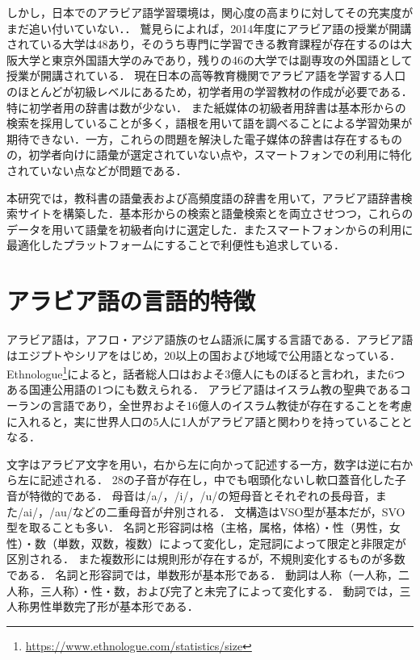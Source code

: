 \documentclass[technicalreport]{ieicej}
\begin{document}
しかし，日本でのアラビア語学習環境は，関心度の高まりに対してその充実度がまだ追い付いていない．．
鷲見\cite{washimi2016}らによれば，2014年度にアラビア語の授業が開講されている大学は48あり，そのうち専門に学習できる教育課程が存在するのは大阪大学と東京外国語大学のみであり，残りの46の大学では副専攻の外国語として授業が開講されている．
現在日本の高等教育機関でアラビア語を学習する人口のほとんどが初級レベルにあるため，初学者用の学習教材の作成が必要である．
特に初学者用の辞書は数が少ない．
また紙媒体の初級者用辞書は基本形からの検索を採用していることが多く，語根を用いて語を調べることによる学習効果が期待できない．一方，これらの問題を解決した電子媒体の辞書は存在するものの，初学者向けに語彙が選定されていない点や，スマートフォンでの利用に特化されていない点などが問題である．

本研究では，教科書の語彙表\cite{aoyama2015}および高頻度語の辞書\cite{buckwalter2009}を用いて，アラビア語辞書検索サイトを構築した．基本形からの検索と語彙検索とを両立させつつ，これらのデータを用いて語彙を初級者向けに選定した．またスマートフォンからの利用に最適化したプラットフォームにすることで利便性も追求している．

\section{アラビア語の言語的特徴}
アラビア語は，アフロ・アジア語族のセム語派に属する言語である．アラビア語はエジプトやシリアをはじめ，20以上の国および地域で公用語となっている．
Ethnologue\footnote{\url{https://www.ethnologue.com/statistics/size}}によると，話者総人口はおよそ3億人にものぼると言われ，また6つある国連公用語の1つにも数えられる．
アラビア語はイスラム教の聖典であるコーランの言語であり，全世界およそ16億人のイスラム教徒が存在することを考慮に入れると，実に世界人口の5人に1人がアラビア語と関わりを持っていることとなる．

文字はアラビア文字を用い，右から左に向かって記述する一方，数字は逆に右から左に記述される．
28の子音が存在し，中でも咽頭化ないし軟口蓋音化した子音が特徴的である．
母音は/a/，/i/，/u/の短母音とそれぞれの長母音，また/ai/，/au/などの二重母音が弁別される．
文構造はVSO型が基本だが，SVO型を取ることも多い．
名詞と形容詞は格（主格，属格，体格）・性（男性，女性）・数（単数，双数，複数）によって変化し，定冠詞によって限定と非限定が区別される．
また複数形には規則形が存在するが，不規則変化するものが多数である．
名詞と形容詞では，単数形が基本形である．
動詞は人称（一人称，二人称，三人称）・性・数，および完了と未完了によって変化する．
動詞では，三人称男性単数完了形が基本形である．
\end{document}
